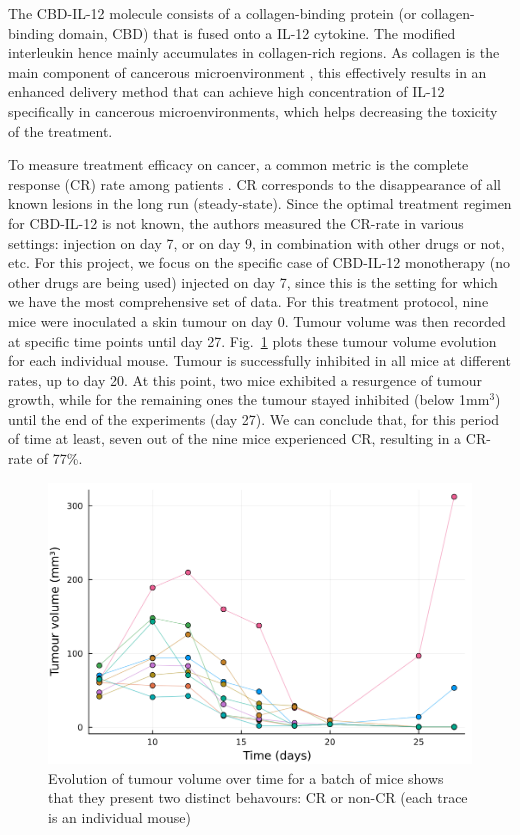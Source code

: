 \documentclass[11pt]{article}
\begin{document}
The CBD-IL-12  molecule consists of a collagen-binding protein (or collagen-binding domain, CBD) that is fused onto a IL-12 cytokine. The modified interleukin hence mainly accumulates in collagen-rich regions. As collagen is the main component of cancerous microenvironment \cite{collagenInCancer}, this effectively results in an enhanced delivery method that can achieve high concentration of IL-12 specifically in cancerous microenvironments, which helps decreasing the toxicity of the treatment.

To measure treatment efficacy on cancer, a common metric is the complete response (CR) rate among patients \cite{cancMetric}. CR corresponds to the disappearance of all known lesions \cite{CRDef} in the long run (steady-state). Since the optimal treatment regimen for CBD-IL-12 is not known, the authors measured the CR-rate in various settings: injection on day 7, or on day 9, in combination with other drugs or not, etc. For this project, we focus on the specific case of CBD-IL-12 monotherapy (no other drugs are being used) injected on day 7, since this is the setting for which we have the most comprehensive set of data. For this treatment protocol, nine mice were inoculated a skin tumour on day 0. Tumour volume was then recorded at specific time points until day 27. Fig.~\ref{fig:outcomedual} plots these tumour volume evolution for each individual mouse. Tumour is successfully inhibited in all mice at different rates, up to day 20. At this point, two mice exhibited a resurgence of tumour growth, while for the remaining ones the tumour stayed inhibited (below 1mm$^3$) until the end of the experiments (day 27). We can conclude that, for this period of time at least, seven out of the nine mice experienced CR, resulting in a CR-rate of 77\%.

\begin{figure}[!ht]
    \centering\includegraphics[scale=0.3]{crnoncr3.png}
    \caption{Evolution of tumour volume over time for a batch of mice shows that they present two distinct behavours: CR or non-CR (each trace is an individual mouse)}
    \label{fig:outcomedual}
\end{figure}
\end{document}
